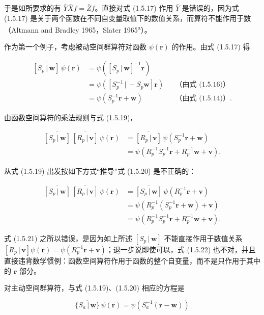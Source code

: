 于是如所要求的有 $\bar{Y}\bar{X}f = \bar{Z}f$。直接对式 (1.5.17) 作用 $\bar{Y}$ 是错误的，因为式 (1.5.17) 是关于两个函数在不同自变量取值下的数值关系，而算符不能作用于数（Altmann and Bradley 1965，Slater 1965\textsuperscript{a}）。

作为第一个例子，考虑被动空间群算符对函数 $\psi(\mathbf{r})$ 的作用。由式 (1.5.17) 得

\begin{align*}
\overline{[S_{p} \,|\, \mathbf{w}]}\,\psi(\mathbf{r}) &= \psi([S_{p} \,|\, \mathbf{w}]^{-1}\mathbf{r}) \\
&= \psi([S_{p}^{-1} \,|\, -S_{p}\mathbf{w}]\mathbf{r}) &&\text{（由式 (1.5.16)）} \tag{1.5.18}\\
&= \psi(S_{p}^{-1}\mathbf{r} + \mathbf{w}) &&\text{（由式 (1.5.14)）}. \tag{1.5.19}
\end{align*}

由函数空间算符的乘法规则与式 (1.5.19)，

\begin{align*}
\overline{[S_{p} \,|\, \mathbf{w}]}\,\overline{[R_{p} \,|\, \mathbf{v}]}\,\psi(\mathbf{r}) &= \overline{[R_{p} \,|\, \mathbf{v}]}\,\psi(S_{p}^{-1}\mathbf{r} + \mathbf{w}) \\
&= \psi(R_{p}^{-1}S_{p}^{-1}\mathbf{r} + R_{p}^{-1}\mathbf{w} + \mathbf{v}). \tag{1.5.20}
\end{align*}

从式 (1.5.19) 出发按如下方式“推导”式 (1.5.20) 是不正确的：

\begin{align*}
\overline{[S_{p} \,|\, \mathbf{w}]}\,\overline{[R_{p} \,|\, \mathbf{v}]}\,\psi(\mathbf{r}) &= \overline{[S_{p} \,|\, \mathbf{w}]}\,\psi(R_{p}^{-1}\mathbf{r} + \mathbf{v}) \tag{1.5.21}\\
&= \psi(R_{p}^{-1}(S_{p}^{-1}\mathbf{r} + \mathbf{w}) + \mathbf{v}) \tag{1.5.22}\\
&= \psi(R_{p}^{-1}S_{p}^{-1}\mathbf{r} + R_{p}^{-1}\mathbf{w} + \mathbf{v}). \tag{1.5.20}
\end{align*}

式 (1.5.21) 之所以错误，是因为如上所述 $[S_{p} \,|\, \mathbf{w}]$ 不能直接作用于数值关系 $[R_{p} \,|\, \mathbf{v}]\psi(\mathbf{r}) = \psi(R_{p}^{-1}\mathbf{r} + \mathbf{v})$；退一步说即使可以，式 (1.5.22) 也不对，并且直接违背数学惯例：函数空间算符作用于函数的整个自变量，而不是只作用于其中的 $\mathbf{r}$ 部分。

对主动空间群算符，与式 (1.5.19)、(1.5.20) 相应的方程是

\begin{equation*}
\overline{\{S_{a} \,|\, \mathbf{w}\}}\,\psi(\mathbf{r}) = \psi(S_{a}^{-1}(\mathbf{r} - \mathbf{w}))
\tag{1.5.23}
\end{equation*}

